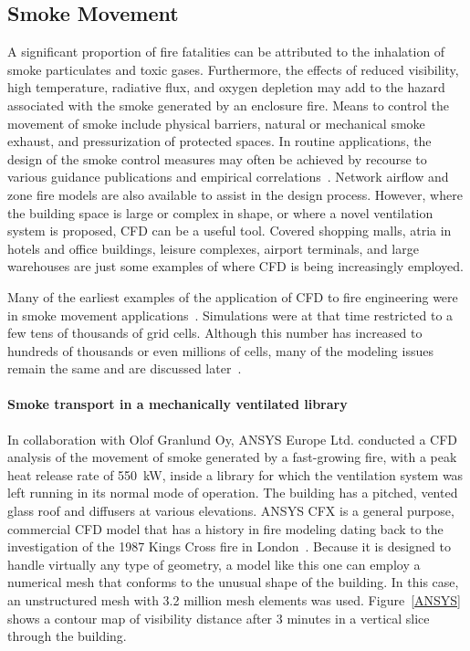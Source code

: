 \documentclass[graybox]{svmult}
\begin{document}
\subsection{Smoke Movement}

A significant proportion of fire fatalities can be attributed to the inhalation of smoke particulates and toxic gases. Furthermore, the effects of reduced visibility, high temperature, radiative flux, and oxygen depletion may add to the hazard associated with the smoke generated by an enclosure fire. Means to control the movement of smoke include physical barriers, natural or mechanical smoke exhaust, and pressurization of protected spaces. In routine applications, the design of the smoke control measures may often be achieved by recourse to various guidance publications and empirical correlations~\cite{Klote, NFPA:92B}. Network airflow and zone fire models are also available to assist in the design process. However, where the building space is large or complex in shape, or where a novel ventilation system is proposed, CFD can be a useful tool. Covered shopping malls, atria in hotels and office buildings, leisure complexes, airport terminals, and large warehouses are just some examples of where CFD is being increasingly employed.

Many  of  the  earliest  examples  of  the  application of CFD to fire engineering were in smoke movement applications~\cite{Pericleous, Cox:1990}. Simulations were at that time restricted to a few tens of thousands of grid cells. Although this number has increased to hundreds of thousands or even millions of cells, many of the modeling issues remain the same and are discussed later~\cite{Kumar}.


\paragraph{Smoke transport in a mechanically ventilated library}

In collaboration with Olof Granlund Oy, ANSYS Europe Ltd. conducted a CFD analysis of the movement of smoke generated by a fast-growing fire, with a peak heat release rate of 550~kW, inside a library for which the ventilation system was left running in its normal mode of operation. The building has a pitched, vented glass roof and diffusers at various elevations. ANSYS CFX is a general purpose, commercial CFD model that has a history in fire modeling dating back to the investigation of the 1987 Kings Cross fire in London~\cite{Simcox}. Because it is designed to handle virtually any type of geometry, a model like this one can employ a numerical mesh that conforms to the unusual shape of the building. In this case, an unstructured mesh with 3.2 million mesh elements was used. Figure~\ref{ANSYS} shows a contour map of visibility distance after 3 minutes in a vertical slice through the building.
\end{document}
